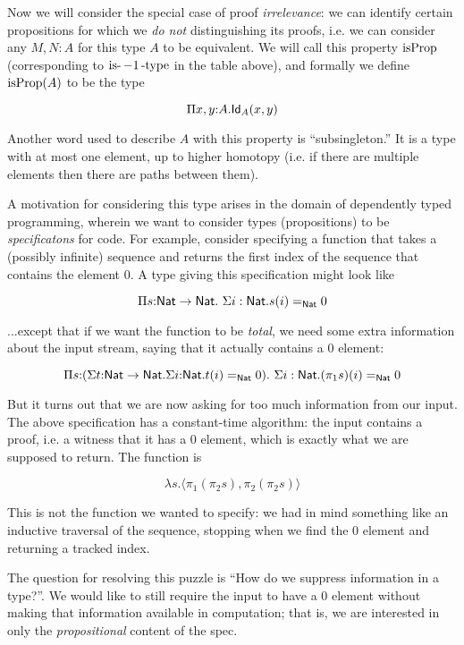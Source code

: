 \documentclass[11pt]{article}
\begin{document}
Now we will consider the special case of proof {\em irrelevance}: we can
identify certain propositions for which we {\em do not}
distinguishing its proofs, i.e. we can consider any $M, N : A$ for this type
$A$ to be equivalent. We will call this property $\operatorname{isProp}$
(corresponding to $\operatorname{is-}-1\operatorname{-type}$ in the table above), and formally
we define $\operatorname{isProp}(A)$ to be the type

\[
\Pi{x,y}{:}A.\mathsf{Id}_{A}(x,y)
\]

Another word used to describe $A$ with this property is ``subsingleton.''
It is a type with at most one element, up to higher homotopy (i.e. if there
are multiple elements then there are paths between them).

A motivation for considering this type arises in the domain of dependently
typed programming, wherein we want to consider types (propositions) to be
{\em specificatons} for code. For example, consider specifying a function
that takes a (possibly infinite) sequence and returns the first index of
the sequence that contains the element $0$. A type giving this
specification might look like

\[
\Pi{s{:}\Nat\to\Nat}.\ \Sigma{i:\Nat}.s(i)=_{\Nat} 0
\]

...except that if we want the function to be {\em total}, we need some
extra information about the input stream, saying that it actually contains
a $0$ element:


\[
\Pi{s{:}(\Sigma{t{:}\Nat\to\Nat}.\Sigma{i{:}\Nat}.t(i) =_{\Nat}0}).\ 
  \Sigma{i:\Nat}.(\pi_1 s)(i)=_{\Nat} 0
\]

But it turns out that we are now asking for too much information from our
input. The above specification has a constant-time algorithm: the input
contains a proof, i.e. a witness that it has a 0 element, which is exactly
what we are supposed to return. The function is

\[
\lambda{s}.\langle \pi_1 (\pi_2 s), \pi_2 (\pi_2 s) \rangle
\]

This is not the function we wanted to specify: we had in mind something
like an inductive traversal of the sequence, stopping when we find the 0
element and returning a tracked index.

The question for resolving this puzzle is ``How do we suppress information
in a type?''. We would like to still require the input to have a 0 element
without making that information available in computation; that is, we are
interested in only the {\em propositional} content of the spec.
\end{document}
